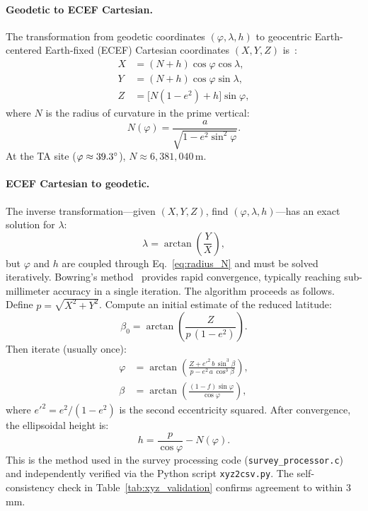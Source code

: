 \paragraph{Geodetic to ECEF Cartesian.} The transformation from geodetic coordinates $(\varphi, \lambda, h)$ to geocentric Earth-centered Earth-fixed (ECEF) Cartesian coordinates $(X, Y, Z)$ is~\cite{nga2014}:
\begin{align}
X &= (N + h)\cos\varphi\cos\lambda, \label{eq:geod2xyz_X}\\
Y &= (N + h)\cos\varphi\sin\lambda, \label{eq:geod2xyz_Y}\\
Z &= \bigl[N(1 - e^2) + h\bigr]\sin\varphi, \label{eq:geod2xyz_Z}
\end{align}
where $N$ is the radius of curvature in the prime vertical:
\begin{equation}
N(\varphi) = \frac{a}{\sqrt{1 - e^2 \sin^2\!\varphi}}.
\label{eq:radius_N}
\end{equation}
At the TA site ($\varphi \approx 39.3^\circ$), $N \approx 6{,}381{,}040$\,m.

\paragraph{ECEF Cartesian to geodetic.} The inverse transformation---given $(X, Y, Z)$, find $(\varphi, \lambda, h)$---has an exact solution for $\lambda$:
\begin{equation}
\lambda = \arctan\!\left(\frac{Y}{X}\right),
\label{eq:xyz2geod_lam}
\end{equation}
but $\varphi$ and $h$ are coupled through Eq.~\eqref{eq:radius_N} and must be solved iteratively. Bowring's method~\cite{bowring1976} provides rapid convergence, typically reaching sub-millimeter accuracy in a single iteration. The algorithm proceeds as follows. Define $p = \sqrt{X^2 + Y^2}$. Compute an initial estimate of the reduced latitude:
\begin{equation}
\beta_0 = \arctan\!\left(\frac{Z}{p\,(1 - e^2)}\right).
\label{eq:bowring_beta0}
\end{equation}
Then iterate (usually once):
\begin{align}
\varphi &= \arctan\!\left(\frac{Z + e'^2\,b\,\sin^3\!\beta}{p - e^2\,a\,\cos^3\!\beta}\right), \label{eq:bowring_phi}\\
\beta &= \arctan\!\left(\frac{(1-f)\sin\varphi}{\cos\varphi}\right), \label{eq:bowring_beta}
\end{align}
where $e'^2 = e^2/(1-e^2)$ is the second eccentricity squared. After convergence, the ellipsoidal height is:
\begin{equation}
h = \frac{p}{\cos\varphi} - N(\varphi).
\label{eq:bowring_h}
\end{equation}
This is the method used in the survey processing code (\texttt{survey\_processor.c}) and independently verified via the Python script \texttt{xyz2csv.py}. The self-consistency check in Table~\ref{tab:xyz_validation} confirms agreement to within 3\,mm.

